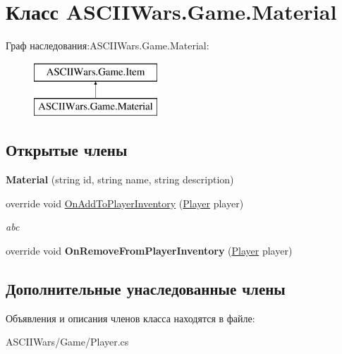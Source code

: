 \hypertarget{class_a_s_c_i_i_wars_1_1_game_1_1_material}{}\section{Класс A\+S\+C\+I\+I\+Wars.\+Game.\+Material}
\label{class_a_s_c_i_i_wars_1_1_game_1_1_material}
Граф наследования\+:A\+S\+C\+I\+I\+Wars.\+Game.\+Material\+:\begin{figure}[H]
\begin{center}
\leavevmode
\includegraphics[height=2.000000cm]{class_a_s_c_i_i_wars_1_1_game_1_1_material}
\end{center}
\end{figure}
\subsection*{Открытые члены}
\begin{DoxyCompactItemize}
\item 
\hypertarget{class_a_s_c_i_i_wars_1_1_game_1_1_material_aa4aee4341c8099508c7ef1f980163e1d}{}\label{class_a_s_c_i_i_wars_1_1_game_1_1_material_aa4aee4341c8099508c7ef1f980163e1d} 
{\bfseries Material} (string id, string name, string description)
\item 
\hypertarget{class_a_s_c_i_i_wars_1_1_game_1_1_material_afedb9d9b8b22782e40371b6cac37d27e}{}\label{class_a_s_c_i_i_wars_1_1_game_1_1_material_afedb9d9b8b22782e40371b6cac37d27e} 
override void \hyperlink{class_a_s_c_i_i_wars_1_1_game_1_1_material_afedb9d9b8b22782e40371b6cac37d27e}{On\+Add\+To\+Player\+Inventory} (\hyperlink{class_a_s_c_i_i_wars_1_1_game_1_1_player}{Player} player)
\begin{DoxyCompactList}\small\item\em abc \end{DoxyCompactList}\item 
\hypertarget{class_a_s_c_i_i_wars_1_1_game_1_1_material_ab8467edc48ff6af4021f550c97cbec31}{}\label{class_a_s_c_i_i_wars_1_1_game_1_1_material_ab8467edc48ff6af4021f550c97cbec31} 
override void {\bfseries On\+Remove\+From\+Player\+Inventory} (\hyperlink{class_a_s_c_i_i_wars_1_1_game_1_1_player}{Player} player)
\end{DoxyCompactItemize}
\subsection*{Дополнительные унаследованные члены}


Объявления и описания членов класса находятся в файле\+:\begin{DoxyCompactItemize}
\item 
A\+S\+C\+I\+I\+Wars/\+Game/Player.\+cs\end{DoxyCompactItemize}
